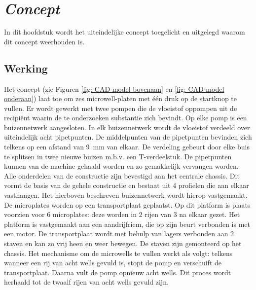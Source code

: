 \documentclass[a4paper,twoside,kulak]{kulakreport} %
\begin{document}
\chapter{\textit{Concept}} 


In dit hoofdstuk wordt het uiteindelijke concept toegelicht en uitgelegd waarom dit concept weerhouden is.

\section{Werking}

	Het concept (zie Figuren \ref{fig: CAD-model bovenaan} en \ref{fig: CAD-model onderaan}) laat toe om zes microwell-platen met één druk op de startknop te vullen. Er wordt gewerkt met twee pompen die de vloeistof oppompen uit de recipiënt waarin de te onderzoeken substantie zich bevindt. Op elke pomp is een buizennetwerk aangesloten. In elk buizennetwerk wordt de vloeistof verdeeld over uiteindelijk acht pipetpunten. De middelpunten van de pipetpunten bevinden zich telkens op een afstand van \SI{9}{mm} van elkaar. De verdeling gebeurt door elke buis te splitsen in twee nieuwe buizen m.b.v. een T-verdeelstuk. De pipetpunten kunnen van de machine gehaald worden en zo gemakkelijk vervangen worden.
	\newline
	Alle onderdelen van de constructie zijn bevestigd aan het centrale chassis. Dit vormt de basis van de gehele constructie en bestaat uit 4 profielen die aan elkaar vasthangen. Het hierboven beschreven buizennetwerk wordt hierop vastgemaakt.
	De microplates worden op een transportplaat geplaatst. Op dit platform is plaats voorzien voor 6 microplates: deze worden in 2 rijen van 3 na elkaar gezet. Het platform is vastgemaakt aan een aandrijfriem, die op zijn beurt verbonden is met een motor. De transportplaat wordt met behulp van lagers verbonden aan 2 staven en kan zo vrij heen en weer bewegen. De staven zijn gemonteerd op het chassis.
	\newline
	Het mechanisme om de microwells te vullen werkt als volgt: telkens wanneer een rij van acht wells gevuld is, stopt de pomp en verschuift de transportplaat. Daarna vult de pomp opnieuw acht wells. Dit proces wordt herhaald tot de twaalf rijen van acht wells gevuld zijn. 
	
\end{document}
